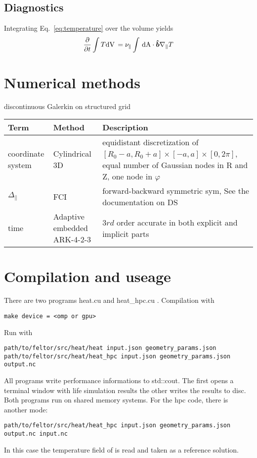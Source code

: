 \subsection{Diagnostics}
Integrating Eq.~\eqref{eq:temperature} over the volume yields
\begin{align}
 \frac{\partial}{\partial t} \int T \mathrm{dV}\, = \nu_\parallel \int \,\mathrm{dA}\cdot \bm{\hat{b}} \nabla_\parallel T
\label{}
\end{align}
\section{Numerical methods}
discontinuous Galerkin on structured grid
\begin{longtable}{ll>{\RaggedRight}p{7cm}}
\toprule
\rowcolor{gray!50}\textbf{Term} &  \textbf{Method} & \textbf{Description}  \\ \midrule
coordinate system & Cylindrical 3D & equidistant discretization of $[R_0-a,R_0+a] \times [-a,a] \times [0,2\pi]$, equal number of Gaussian nodes in R and Z, one node in $\varphi$ \\
$\Delta_\parallel$ & FCI & forward-backward symmetric sym, See the documentation on DS\\
time &  Adaptive embedded ARK-4-2-3 & $3rd$ order accurate in both
explicit and implicit parts\\
\bottomrule
\end{longtable}

\section{Compilation and useage}
There are two programs heat.cu and heat\_hpc.cu . Compilation with
\begin{verbatim}
make device = <omp or gpu>
\end{verbatim}
Run with
\begin{verbatim}
path/to/feltor/src/heat/heat input.json geometry_params.json
path/to/feltor/src/heat/heat_hpc input.json geometry_params.json output.nc
\end{verbatim}
All programs write performance informations to std::cout.
The first opens a terminal window with life simulation results
the
other writes the results to disc. Both programs run on shared memory
systems.
For the hpc code, there is another mode:
\begin{verbatim}
path/to/feltor/src/heat/heat_hpc input.json geometry_params.json output.nc input.nc
\end{verbatim}
In this case the temperature field of  is read
and taken as a reference solution.


